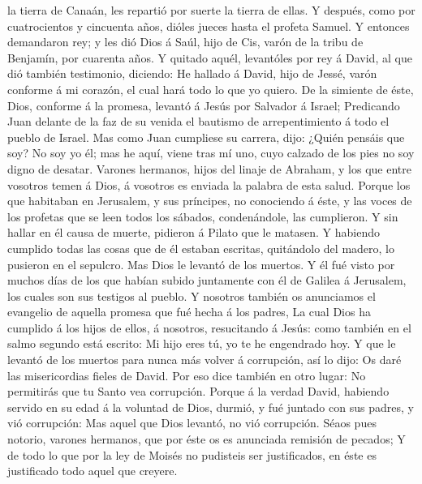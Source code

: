 la tierra de Canaán, les repartió por suerte la tierra de ellas.
 Y después, como por cuatrocientos y cincuenta años, dióles
jueces hasta el profeta Samuel.  Y entonces demandaron rey;
y les dió Dios á Saúl, hijo de Cis, varón de la tribu de Benjamín, por
cuarenta años.  Y quitado aquél, levantóles por rey á
David, al que dió también testimonio, diciendo: He hallado á David, hijo
de Jessé, varón conforme á mi corazón, el cual hará todo lo que yo
quiero.  De la simiente de éste, Dios, conforme á la
promesa, levantó á Jesús por Salvador á Israel;  Predicando
Juan delante de la faz de su venida el bautismo de arrepentimiento á
todo el pueblo de Israel.  Mas como Juan cumpliese su
carrera, dijo: ¿Quién pensáis que soy? No soy yo él; mas he aquí, viene
tras mí uno, cuyo calzado de los pies no soy digno de desatar.
 Varones hermanos, hijos del linaje de Abraham, y los que
entre vosotros temen á Dios, á vosotros es enviada la palabra de esta
salud.  Porque los que habitaban en Jerusalem, y sus
príncipes, no conociendo á éste, y las voces de los profetas que se leen
todos los sábados, condenándole, las cumplieron.  Y sin
hallar en él causa de muerte, pidieron á Pilato que le matasen.
 Y habiendo cumplido todas las cosas que de él estaban
escritas, quitándolo del madero, lo pusieron en el sepulcro.
 Mas Dios le levantó de los muertos.  Y él fué
visto por muchos días de los que habían subido juntamente con él de
Galilea á Jerusalem, los cuales son sus testigos al pueblo.
 Y nosotros también os anunciamos el evangelio de aquella
promesa que fué hecha á los padres,  La cual Dios ha
cumplido á los hijos de ellos, á nosotros, resucitando á Jesús: como
también en el salmo segundo está escrito: Mi hijo eres tú, yo te he
engendrado hoy.  Y que le levantó de los muertos para nunca
más volver á corrupción, así lo dijo: Os daré las misericordias fieles
de David.  Por eso dice también en otro lugar: No
permitirás que tu Santo vea corrupción.  Porque á la verdad
David, habiendo servido en su edad á la voluntad de Dios, durmió, y fué
juntado con sus padres, y vió corrupción:  Mas aquel que
Dios levantó, no vió corrupción.  Séaos pues notorio,
varones hermanos, que por éste os es anunciada remisión de pecados;
 Y de todo lo que por la ley de Moisés no pudisteis ser
justificados, en éste es justificado todo aquel que creyere.
